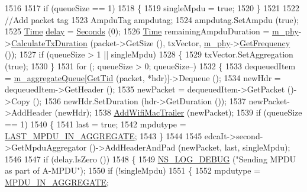 \begin{DoxyCode}
1516 
1517       \textcolor{keywordflow}{if} (queueSize == 1)
1518         \{
1519           singleMpdu = \textcolor{keyword}{true};
1520         \}
1521 
1522       \textcolor{comment}{//Add packet tag}
1523       AmpduTag ampdutag;
1524       ampdutag.SetAmpdu (\textcolor{keyword}{true});
1525       \hyperlink{namespacens3_1_1TracedValueCallback_a7ffd3e7c142ffe7c8a1d2db9b8de38ec}{Time} \hyperlink{lte_2model_2fading-traces_2fading__trace__generator_8m_a7964e6aa8f61a9d28973c8267a606ad8}{delay} = \hyperlink{group__timecivil_ga33c34b816f8ff6628e33d5c8e9713b9e}{Seconds} (0);
1526       \hyperlink{namespacens3_1_1TracedValueCallback_a7ffd3e7c142ffe7c8a1d2db9b8de38ec}{Time} remainingAmpduDuration = \hyperlink{classns3_1_1MacLow_aec8aefec9501f9d7c06b6cd0ee1353ee}{m\_phy}->\hyperlink{classns3_1_1WifiPhy_aee98c7241bb4f0bb8e6d90f5771dacc7}{CalculateTxDuration} (packet->GetSize
       (), txVector, \hyperlink{classns3_1_1MacLow_aec8aefec9501f9d7c06b6cd0ee1353ee}{m\_phy}->\hyperlink{classns3_1_1WifiPhy_ad2508d94faf22d690d6b8b4367934fd1}{GetFrequency} ());
1527       \textcolor{keywordflow}{if} (queueSize > 1 || singleMpdu)
1528         \{
1529           txVector.SetAggregation (\textcolor{keyword}{true});
1530         \}
1531       \textcolor{keywordflow}{for} (; queueSize > 0; queueSize--)
1532         \{
1533           dequeuedItem = \hyperlink{classns3_1_1MacLow_a50ea30f5dff00a3ef2683b9275717c6f}{m\_aggregateQueue}[\hyperlink{group__wifi_ga92cc18e2c5aa6bed3728860bbad76ff8}{GetTid} (packet, *hdr)]->Dequeue ();
1534           newHdr = dequeuedItem->GetHeader ();
1535           newPacket = dequeuedItem->GetPacket ()->Copy ();
1536           newHdr.SetDuration (hdr->GetDuration ());
1537           newPacket->AddHeader (newHdr);
1538           \hyperlink{classns3_1_1MacLow_acaafc67755f16f347e9161310d71e3ef}{AddWifiMacTrailer} (newPacket);
1539           \textcolor{keywordflow}{if} (queueSize == 1)
1540             \{
1541               last = \textcolor{keyword}{true};
1542               mpdutype = \hyperlink{namespacens3_ae617d41bbd0c07fa58ee2306f687b055a00f5645550d1d4766ba10c4ac229b276}{LAST\_MPDU\_IN\_AGGREGATE};
1543             \}
1544 
1545           edcaIt->second->GetMpduAggregator ()->AddHeaderAndPad (newPacket, last, singleMpdu);
1546 
1547           \textcolor{keywordflow}{if} (delay.IsZero ())
1548             \{
1549               \hyperlink{group__logging_ga413f1886406d49f59a6a0a89b77b4d0a}{NS\_LOG\_DEBUG} (\textcolor{stringliteral}{"Sending MPDU as part of A-MPDU"});
1550               \textcolor{keywordflow}{if} (!singleMpdu)
1551                 \{
1552                   mpdutype = \hyperlink{namespacens3_ae617d41bbd0c07fa58ee2306f687b055ac78adeb4fa20b2eefca65601b0b38625}{MPDU\_IN\_AGGREGATE};

\end{DoxyCode}
